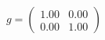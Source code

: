 \documentclass[preview]{standalone}
\begin{document}
\begin{align*}
g = \begin{pmatrix} 1.00 & 0.00 \\ 0.00 & 1.00 \end{pmatrix}
\end{align*}
\end{document}

